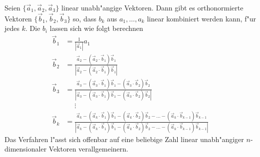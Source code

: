 \begin{satz}
\label{satz-gram-schmidt}
Seien $\{\vec a_1,\vec a_2,\vec a_3\}$ linear unabh"angige Vektoren.
Dann gibt es orthonormierte Vektoren $\{\vec b_1,\vec b_2,\vec b_3\}$ so,
dass $b_k$ aus $a_1,\dots,a_k$ linear kombiniert werden kann, f"ur jedes $k$.
Die $b_i$ lassen sich wie folgt berechnen
\begin{align*}
\vec b_1&=\frac1{|\vec a_1|}a_1\\
\vec b_2&=
\frac{
\vec a_2-(\vec a_2\cdot \vec b_1)\vec b_1
}{
|\vec a_2-(\vec a_2\cdot \vec b_1)\vec b_1|
}
\\
\vec b_3
&=
\frac{
\vec a_3-(\vec a_3\cdot \vec b_1)\vec b_1-(\vec a_3\cdot\vec b_2)\vec b_2
}{
|
\vec a_3-(\vec a_3\cdot \vec b_1)\vec b_1-(\vec a_3\cdot\vec b_2)\vec b_2
|
}
\\
&\phantom{=}\vdots\\
\vec b_k&=\frac{\vec a_k-(\vec a_k\cdot \vec b_1)\vec b_1-(\vec a_k\cdot \vec b_2)\vec b_2-\dots-(\vec a_k\cdot \vec b_{k-1})\vec b_{k-1}}{|\vec a_k-(\vec a_k\cdot \vec b_1)\vec b_1-(\vec a_k\cdot \vec b_2)\vec b_2-\dots-(\vec a_k\cdot \vec b_{k-1})\vec b_{k-1}|}
\end{align*}
Das Verfahren l"asst sich offenbar auf eine beliebige Zahl linear
unabh"angiger $n$-dimensionaler Vektoren verallgemeinern.
\end{satz}

